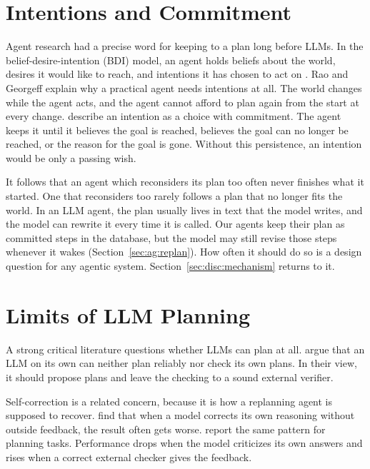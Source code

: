 \section{Intentions and Commitment}
\label{sec:bg:commitment}

Agent research had a precise word for keeping to a plan long before LLMs. In
the belief-desire-intention (BDI) model, an agent holds beliefs about the
world, desires it would like to reach, and intentions it has chosen to act on
\parencite{rao1995}. Rao and Georgeff explain why a practical agent needs
intentions at all. The world changes while the agent acts, and the agent
cannot afford to plan again from the start at every change.
\textcite{cohen1990} describe an intention as a choice with commitment. The
agent keeps it until it believes the goal is reached, believes the goal can no
longer be reached, or the reason for the goal is gone. Without this
persistence, an intention would be only a passing wish.

It follows that an agent which reconsiders its plan too often never finishes
what it started. One that reconsiders too rarely follows a plan that no longer
fits the world. In an LLM agent, the plan usually lives in text
that the model writes, and the model can rewrite it every time it is called.
Our agents keep their plan as committed steps in the database, but the model
may still revise those steps whenever it wakes (Section~\ref{sec:ag:replan}).
How often it should do so is a design question for any agentic
system. Section~\ref{sec:disc:mechanism} returns to it.

\section{Limits of LLM Planning}
\label{sec:bg:llmlimits}

A strong critical literature questions whether LLMs can plan at all.
\textcite{kambhampati2024} argue that an LLM on its own can neither plan
reliably nor check its own plans. In their view, it should propose plans and
leave the checking to a sound external verifier.

Self-correction is a related concern, because it is how a replanning agent is
supposed to recover. \textcite{huang2024} find that when a model corrects its
own reasoning without outside feedback, the result often gets worse.
\textcite{stechly2024} report the same pattern for planning tasks. Performance
drops when the model criticizes its own answers and rises when a correct
external checker gives the feedback.

